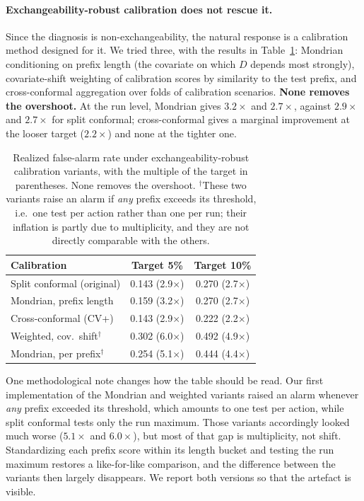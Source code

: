 \documentclass{article}
\begin{document}
\paragraph{Exchangeability-robust calibration does not rescue it.}
Since the diagnosis is non-exchangeability, the natural response is a calibration method designed for it. We tried three, with the results in Table~\ref{tab:conformal}: Mondrian conditioning on prefix length (the covariate on which $D$ depends most strongly), covariate-shift weighting of calibration scores by similarity to the test prefix, and cross-conformal aggregation over folds of calibration scenarios. \textbf{None removes the overshoot.} At the run level, Mondrian gives $3.2\times$ and $2.7\times$, against $2.9\times$ and $2.7\times$ for split conformal; cross-conformal gives a marginal improvement at the looser target ($2.2\times$) and none at the tighter one.

\begin{table}[t]
\caption{Realized false-alarm rate under exchangeability-robust calibration variants, with the multiple of the target in parentheses. None removes the overshoot. $^\dagger$These two variants raise an alarm if \emph{any} prefix exceeds its threshold, i.e.\ one test per action rather than one per run; their inflation is partly due to multiplicity, and they are not directly comparable with the others.}
\label{tab:conformal}
\vskip 0.1in
\begin{center}\begin{small}
\setlength{\tabcolsep}{4pt}
\begin{tabular}{lcc}
\toprule
Calibration & Target 5\% & Target 10\% \\
\midrule
Split conformal (original) & 0.143 (2.9$\times$) & 0.270 (2.7$\times$) \\
Mondrian, prefix length & 0.159 (3.2$\times$) & 0.270 (2.7$\times$) \\
Cross-conformal (CV+) & 0.143 (2.9$\times$) & 0.222 (2.2$\times$) \\
Weighted, cov.\ shift$^\dagger$ & 0.302 (6.0$\times$) & 0.492 (4.9$\times$) \\
Mondrian, per prefix$^\dagger$ & 0.254 (5.1$\times$) & 0.444 (4.4$\times$) \\
\bottomrule
\end{tabular}
\end{small}\end{center}
\vskip -0.1in
\end{table}

One methodological note changes how the table should be read. Our first implementation of the Mondrian and weighted variants raised an alarm whenever \emph{any} prefix exceeded its threshold, which amounts to one test per action, while split conformal tests only the run maximum. Those variants accordingly looked much worse ($5.1\times$ and $6.0\times$), but most of that gap is multiplicity, not shift. Standardizing each prefix score within its length bucket and testing the run maximum restores a like-for-like comparison, and the difference between the variants then largely disappears. We report both versions so that the artefact is visible.
\end{document}
